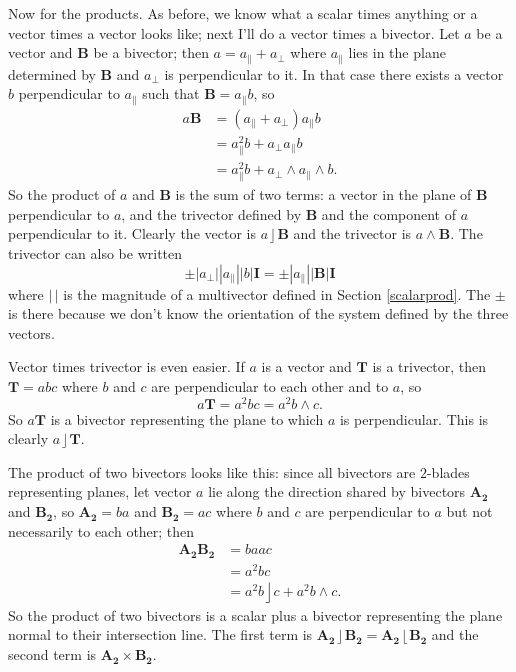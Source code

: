 \documentclass{utarticle}
\newcommand{\bl}[1]{\ensuremath{\bm{#1}}}
\newcommand{\I}{\bl{I}}
\DeclareMathOperator{\lin}{\rfloor}
\DeclareMathOperator{\rin}{\lfloor}
\DeclareMathOperator{\out}{\wedge}
\newcommand{\commute}[2]{\ensuremath{#1 \times #2}}
\begin{document}
Now for the products.  As before, we know what a scalar times anything or 
a vector times a vector looks like; next I'll do a vector times a bivector.  Let 
$a$ be a vector and \bl{B} be a
bivector; then $a = a_\parallel + a_\perp$ where $a_\parallel$ lies in
the plane determined by \bl{B} and $a_\perp$ is perpendicular to it.  In
that case there exists a vector $b$ perpendicular to $a_\parallel$
such that $\bl{B} = a_\parallel b$, so
\begin{align}
a \bl{B} & = (a_\parallel + a_\perp) a_\parallel b \nonumber \\
 & = a_\parallel^2 b + a_\perp a_\parallel b \nonumber \\
 & = a_\parallel^2 b + a_\perp \out a_\parallel \out b.
\end{align}
So the product of $a$ and \bl{B} is the sum of two terms: a
vector in the plane of \bl{B} perpendicular to $a$, and the 
trivector defined by \bl{B} and the component of
$a$ perpendicular to it.  Clearly the vector is $a \lin \bl{B}$ and 
the trivector is $a \out \bl{B}$.  The trivector can also be written
\begin{equation} 
\pm |a_\perp| |a_\parallel| |b| \I = \pm |a_\parallel| |\bl{B}| \I 
\end{equation} 
where $|\,|$ is the magnitude of a multivector defined in Section 
\ref{scalarprod}.  The $\pm$ is there because we don't know the 
orientation of the system defined by the three vectors.  

Vector times trivector is even easier.  If $a$ is a vector and \bl{T} 
is a trivector, then $\bl{T} = a b c$ where $b$
and $c$ are perpendicular to each other and to $a$, so
\begin{equation} a\bl{T} = a^2 b c = a^2 b \out c. \end{equation}
So $a \bl{T}$ is a bivector representing the plane to which $a$ is
perpendicular.  This is clearly $a \lin \bl{T}$.

The product of two bivectors looks like this:  since all bivectors are 
$2$-blades representing planes, let vector $a$ lie along the direction 
shared by bivectors \bl{A_2} and \bl{B_2}, so $\bl{A_2}=ba$ and 
$\bl{B_2}=ac$ where $b$ and $c$ are perpendicular to $a$ but not
necessarily to each other; then
\begin{align}
\bl{A_2} \bl{B_2} & = b a a c \nonumber \\
 & = a^2 b c \nonumber \\
 & = a^2 b \lin c + a^2 b \out c.
\end{align}
So the product of two bivectors is a scalar plus a bivector
representing the plane normal to their intersection line.  The first term
is $\bl{A_2} \lin \bl{B_2} = \bl{A_2} \rin \bl{B_2}$ and the second term is 
$\commute{\bl{A_2}}{\bl{B_2}}$.
\end{document}
